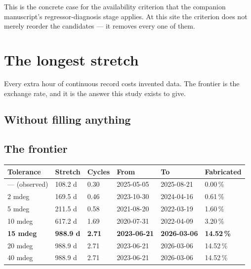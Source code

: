 \documentclass[11pt,a4paper]{article}
\begin{document}
This is the concrete case for the availability criterion that the companion
manuscript's regressor-diagnosis stage applies. At this site the criterion does
not merely reorder the candidates --- it removes every one of them.

\section{The longest stretch}
\label{sec:stretch}

Every extra hour of continuous record costs invented data. The frontier is the
exchange rate, and it is the answer this study exists to give.

\subsection{Without filling anything}


\subsection{The frontier}

\begin{center}
\small
\begin{tabular}{lR{1.6cm}R{1.4cm}llR{2.0cm}}
\toprule
\textbf{Tolerance} & \textbf{Stretch} & \textbf{Cycles} & \textbf{From} &
\textbf{To} & \textbf{Fabricated} \\
\midrule
--- (observed) & 108.2 d & 0.30 & 2025-05-05 & 2025-08-21 & 0.00\,\% \\
2 mdeg   & 169.5 d & 0.46 & 2023-10-30 & 2024-04-16 &  0.61\,\% \\
5 mdeg   & 211.5 d & 0.58 & 2021-08-20 & 2022-03-19 &  1.60\,\% \\
10 mdeg  & 617.2 d & 1.69 & 2020-07-31 & 2022-04-09 &  3.20\,\% \\
\textbf{15 mdeg} & \textbf{988.9 d} & \textbf{2.71} &
\textbf{2023-06-21} & \textbf{2026-03-06} & \textbf{14.52\,\%} \\
20 mdeg  & 988.9 d & 2.71 & 2023-06-21 & 2026-03-06 & 14.52\,\% \\
40 mdeg  & 988.9 d & 2.71 & 2023-06-21 & 2026-03-06 & 14.52\,\% \\
\bottomrule
\end{tabular}
\end{center}
\end{document}
